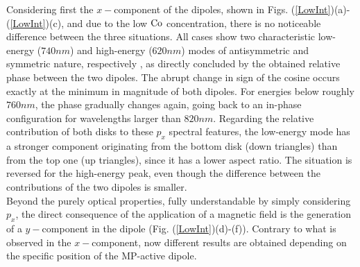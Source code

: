Considering first the $x-$component of the dipoles, shown in Figs. (\ref{LowInt})(a)-(\ref{LowInt})(c), and due to the low $\textnormal{Co}$ concentration, there is no noticeable difference between the three situations. All cases show two characteristic low-energy ($740nm$) and high-energy ($620nm$) modes of antisymmetric and symmetric nature, respectively \cite{dmitriev2007gold,armelles2013mimicking,banthi2012high}, as directly concluded by the obtained relative phase between the two dipoles. The abrupt change in sign of the cosine occurs exactly at the minimum in magnitude of both dipoles. For energies below roughly $760nm$, the phase gradually changes again, going back to an in-phase configuration for wavelengths larger than $820nm$. Regarding the relative contribution of both disks to these $p_{x}$ spectral features, the low-energy mode has a stronger component originating from the bottom disk (down triangles) than from the top one (up triangles), since it has a lower aspect ratio. The situation is reversed for the high-energy peak, even though the difference between the contributions of the two dipoles is smaller.\\
Beyond the purely optical properties, fully understandable by simply considering $p_{x}$, the direct consequence of the application of a magnetic field is the generation of a $y-$component in the dipole \cite{sepulveda2010plasmon,armelles2013mimicking} (Fig. (\ref{LowInt})(d)-(f)). Contrary to what is observed in the $x-$component, now different results are obtained depending on the specific position of the MP-active dipole.\\
